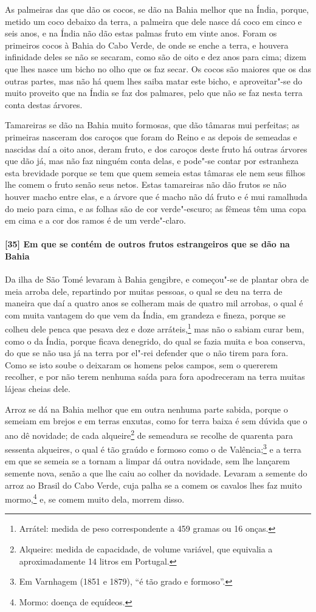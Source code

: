 \begin{linenumbers}
As palmeiras das que dão os cocos, se dão na Bahia melhor que na Índia, porque, metido um
coco debaixo da terra, a palmeira que dele nasce dá coco em cinco e seis anos, e na Índia
não dão estas palmas fruto em vinte anos. Foram os primeiros cocos à Bahia do Cabo Verde,
de onde se enche a terra, e houvera infinidade deles se não se secaram, como são de oito e
dez anos para cima; dizem que lhes nasce um bicho no olho que os faz secar. Os cocos são
maiores que os das outras partes, mas não há quem lhes saiba matar este bicho, e
aproveitar"-se do muito proveito que na Índia se faz dos palmares, pelo que não se faz
nesta terra conta destas árvores.

Tamareiras se dão na Bahia muito formosas, que dão tâmaras mui perfeitas; as primeiras
nasceram dos caroços que foram do Reino e as depois de semeadas e nascidas daí a oito
anos, deram fruto, e dos caroços deste fruto há outras árvores que dão já, mas não faz
ninguém conta delas, e pode"-se contar por estranheza esta brevidade porque se tem que quem
semeia estas tâmaras ele nem seus filhos lhe comem o fruto senão seus netos. Estas
tamareiras não dão frutos se não houver macho entre elas, e a árvore que é macho não dá
fruto e é mui ramalhuda do meio para cima, e as folhas são de cor verde"-escuro; as fêmeas
têm uma copa em cima e a cor dos ramos é de um verde"-claro.

\paragraph{[35] Em que se contém de outros frutos estrangeiros que se dão na Bahia}\quad
Da ilha de São Tomé levaram à Bahia gengibre, e começou"-se de plantar obra de meia arroba
dele, repartindo por muitas pessoas, o qual se deu na terra de maneira que daí a quatro
anos se colheram mais de quatro mil arrobas, o qual é com muita vantagem do que vem da
Índia, em grandeza e fineza, porque se colheu dele penca que pesava dez e doze
arráteis,\footnote{ Arrátel: medida de peso correspondente a 459 gramas ou 16 onças.} mas
não o sabiam curar bem, como o da Índia, porque ficava denegrido, do qual se fazia muita e
boa conserva, do que se não usa já na terra por el"-rei defender que o não tirem para fora.
Como se isto soube o deixaram os homens pelos campos, sem o quererem recolher, e por não
terem nenhuma saída para fora apodreceram na terra muitas lájeas cheias dele.

Arroz se dá na Bahia melhor que em outra nenhuma parte sabida, porque o semeiam em brejos
e em terras enxutas, como for terra baixa é sem dúvida que o ano dê novidade; de cada
alqueire\footnote{ Alqueire: medida de capacidade, de volume variável, que equivalia a
aproximadamente 14 litros em Portugal.} de semeadura se recolhe de quarenta para sessenta
alqueires, o qual é tão graúdo e formoso como o de Valência;\footnote{ Em Varnhagem (1851
e 1879), ``é tão grado e formoso''.} e a terra em que se semeia se a tornam a limpar dá
outra novidade, sem lhe lançarem semente nova, senão a que lhe caiu ao colher da novidade.
Levaram a semente do arroz ao Brasil do Cabo Verde, cuja palha se a comem os cavalos lhes
faz muito mormo,\footnote{ Mormo: doença de equídeos.} e, se comem muito dela, morrem disso.


\end{linenumbers}
